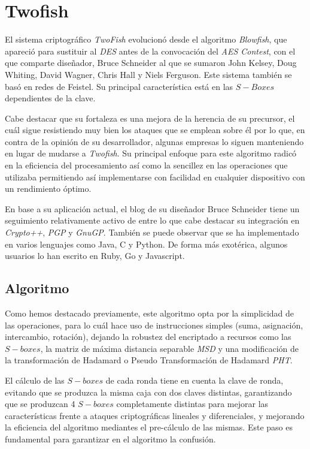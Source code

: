 \section{Twofish}
\label{sec:Twofish}
El sistema criptográfico \textit{TwoFish} evolucionó desde el algoritmo \textit{Blowfish}, que apareció para sustituir al \textit{DES} antes de la convocación del \textit{AES Contest}, con el que comparte diseñador, Bruce Schneider \cite{BlowfishWiki} al que se sumaron John Kelsey, Doug Whiting, David Wagner, Chris Hall y Niels Ferguson. Este sistema también se basó en redes de Feistel. Su principal característica está en las $S-Boxes$ dependientes de la clave.

Cabe destacar que su fortaleza es una mejora de la herencia de su precursor, el cuál sigue resistiendo muy bien los ataques que se emplean sobre él por lo que, en contra de la opinión de su desarrollador, algunas empresas lo siguen manteniendo en lugar de mudarse a \textit{Twofish}. Su principal enfoque para este algoritmo radicó en la eficiencia del procesamiento así como la sencillez en las operaciones que utilizaba permitiendo así implementarse con facilidad en cualquier dispositivo con un rendimiento óptimo. \cite{TwoFish_AES}

En base a su aplicación actual, el blog de su diseñador Bruce Schneider tiene un seguimiento relativamente activo\cite{TwoFish_Apps} de entre lo que cabe destacar su integración en \textit{Crypto++}\cite{Crypto}, \textit{PGP} y \textit{GnuGP}. También se puede observar que se ha implementado en varios lenguajes como Java, C\cite{Implementations} y Python. De forma más exotérica, algunos usuarios lo han escrito en Ruby, Go y Javascript.

\subsection{Algoritmo}
Como hemos destacado previamente, este algoritmo opta por la simplicidad de las operaciones, para lo cuál hace uso de instrucciones simples (suma, asignación, intercambio, rotación), dejando la robustez del encriptado a recursos como las $S-boxes$, la matriz de máxima distancia separable \textit{MSD} y una modificación de la transformación de Hadamard o Pseudo Transformación de Hadamard \textit{PHT}.

El cálculo de las $S-boxes$ de cada ronda tiene en cuenta la clave de ronda, evitando que se produzca la misma caja con dos claves distintas, garantizando que se produzcan 4 $S-boxes$ completamente distintas para mejorar las características frente a ataques criptográficas lineales y diferenciales, y mejorando la eficiencia del algoritmo mediantes el pre-cálculo de las mismas. Este paso es fundamental para garantizar en el algoritmo la confusión.

